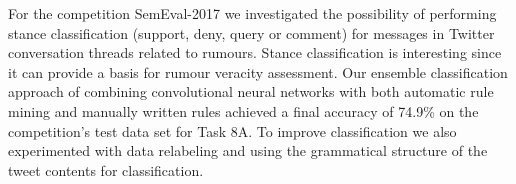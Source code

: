 For the competition SemEval-2017 we investigated the possibility of performing stance classification (support, deny, query or comment) for messages in Twitter conversation threads related to rumours. Stance classification is interesting since it can provide a basis for rumour veracity assessment. Our ensemble classification approach of combining convolutional neural networks with both automatic rule mining and manually written rules achieved a final accuracy of 74.9\% on the competition's test data set for Task 8A. To improve classification we also experimented with data relabeling and using the grammatical structure of the tweet contents for classification.
